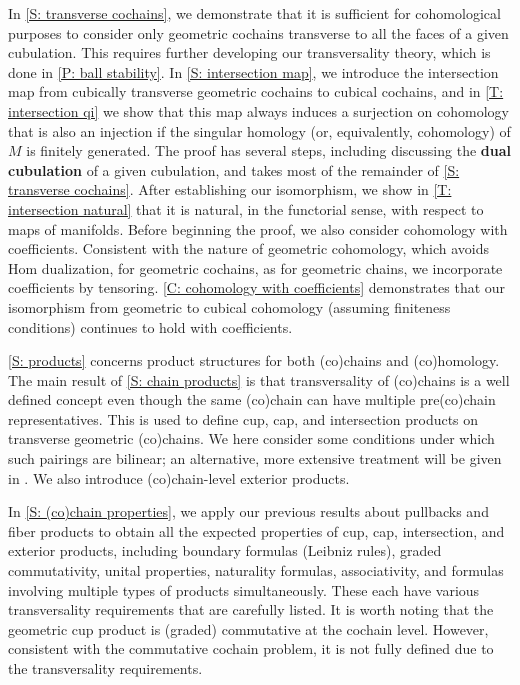 In  \cref{S: transverse cochains}, we demonstrate that it is sufficient for cohomological purposes to consider only geometric cochains transverse to all the faces of a given cubulation.
This requires further developing our transversality theory, which is done in \cref{P: ball stability}.
In \cref{S: intersection map}, we introduce the intersection map from cubically transverse geometric cochains to cubical cochains, and in \cref{T: intersection qi} we show that this map always induces a surjection on cohomology that is also an injection if the singular homology (or, equivalently, cohomology) of $M$ is finitely generated.
The proof has several steps, including discussing the \textbf{dual cubulation} of a given cubulation, and takes most of the remainder of \cref{S: transverse cochains}.
After establishing our isomorphism, we show in \cref{T: intersection natural} that it is natural, in the functorial sense, with respect to maps of manifolds.
Before beginning the proof, we also consider cohomology with coefficients.
Consistent with the nature of geometric cohomology, which avoids Hom dualization, for geometric cochains, as for geometric chains, we incorporate coefficients by tensoring.
\cref{C: cohomology with coefficients} demonstrates that our isomorphism from geometric to cubical cohomology (assuming finiteness conditions) continues to hold with coefficients.


\cref{S: products} concerns product structures for both  (co)chains and (co)homology.
The main result of \cref{S: chain products} is that transversality of (co)chains is a well defined concept even though the same (co)chain can have multiple pre(co)chain representatives.
This is used to define cup, cap, and intersection products on transverse geometric (co)chains.
We here consider some conditions under which such pairings are bilinear; an alternative, more extensive treatment will be given in \cite{GBF47}.
We also introduce (co)chain-level exterior products.

In \cref{S: (co)chain properties}, we apply our previous results about pullbacks and fiber products to obtain all the expected properties of cup, cap, intersection, and exterior products, including boundary formulas (Leibniz rules), graded commutativity, unital properties, naturality formulas, associativity, and formulas involving multiple types of products simultaneously.
These each have various transversality requirements that are carefully listed.
It is worth noting that the geometric cup product is (graded) commutative at the cochain level.
However, consistent with the commutative cochain problem, it is not fully defined due to the transversality requirements.

